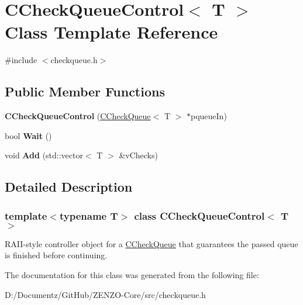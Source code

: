 \hypertarget{class_c_check_queue_control}{}\section{C\+Check\+Queue\+Control$<$ T $>$ Class Template Reference}
\label{class_c_check_queue_control}


{\ttfamily \#include $<$checkqueue.\+h$>$}

\subsection*{Public Member Functions}
\begin{DoxyCompactItemize}
\item 
\mbox{\label{class_c_check_queue_control_ae690afca20574a7c98e0c5e82011c606}} 
{\bfseries C\+Check\+Queue\+Control} (\mbox{\hyperlink{class_c_check_queue}{C\+Check\+Queue}}$<$ T $>$ $\ast$pqueue\+In)
\item 
\mbox{\label{class_c_check_queue_control_ab31d809a76b876d21608c0c5d0e3baf0}} 
bool {\bfseries Wait} ()
\item 
\mbox{\label{class_c_check_queue_control_aa11e8248c91b0758b39132db4090ff8d}} 
void {\bfseries Add} (std\+::vector$<$ T $>$ \&v\+Checks)
\end{DoxyCompactItemize}


\subsection{Detailed Description}
\subsubsection*{template$<$typename T$>$\newline
class C\+Check\+Queue\+Control$<$ T $>$}

R\+A\+I\+I-\/style controller object for a \mbox{\hyperlink{class_c_check_queue}{C\+Check\+Queue}} that guarantees the passed queue is finished before continuing. 

The documentation for this class was generated from the following file\+:\begin{DoxyCompactItemize}
\item 
D\+:/\+Documentz/\+Git\+Hub/\+Z\+E\+N\+Z\+O-\/\+Core/src/checkqueue.\+h\end{DoxyCompactItemize}

